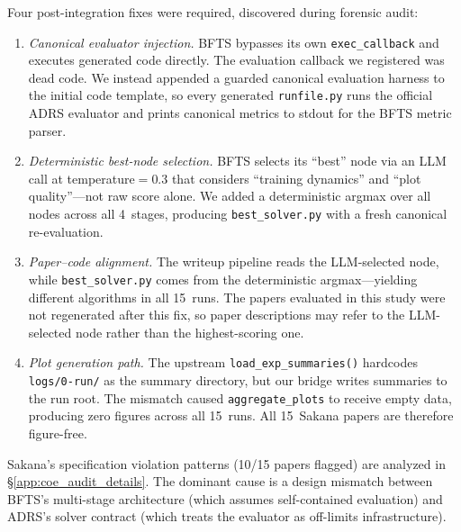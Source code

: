 Four post-integration fixes were required, discovered during forensic audit:
\begin{enumerate}[nosep,leftmargin=*]
\item \emph{Canonical evaluator injection.}
BFTS bypasses its own \texttt{exec\_callback} and executes generated code directly. The evaluation callback we registered was dead code.
We instead appended a guarded canonical evaluation harness to the initial code template, so every generated \texttt{runfile.py} runs the official ADRS evaluator and prints canonical metrics to stdout for the BFTS metric parser.
\item \emph{Deterministic best-node selection.}
BFTS selects its ``best'' node via an LLM call at temperature$=$0.3 that considers ``training dynamics'' and ``plot quality''---not raw score alone.
We added a deterministic argmax over all nodes across all 4~stages, producing \texttt{best\_solver.py} with a fresh canonical re-evaluation.
\item \emph{Paper--code alignment.}
The writeup pipeline reads the LLM-selected node, while \texttt{best\_solver.py} comes from the deterministic argmax---yielding different algorithms in all 15~runs.
The papers evaluated in this study were not regenerated after this fix, so paper descriptions may refer to the LLM-selected node rather than the highest-scoring one.
\item \emph{Plot generation path.}
The upstream \texttt{load\_exp\_summaries()} hardcodes \texttt{logs/0-run/} as the summary directory, but our bridge writes summaries to the run root.
The mismatch caused \texttt{aggregate\_plots} to receive empty data, producing zero figures across all 15~runs.
All 15~Sakana papers are therefore figure-free.
\end{enumerate}

Sakana's specification violation patterns (10/15 papers flagged) are analyzed in \S\ref{app:coe_audit_details}. The dominant cause is a design mismatch between BFTS's multi-stage architecture (which assumes self-contained evaluation) and ADRS's solver contract (which treats the evaluator as off-limits infrastructure).

